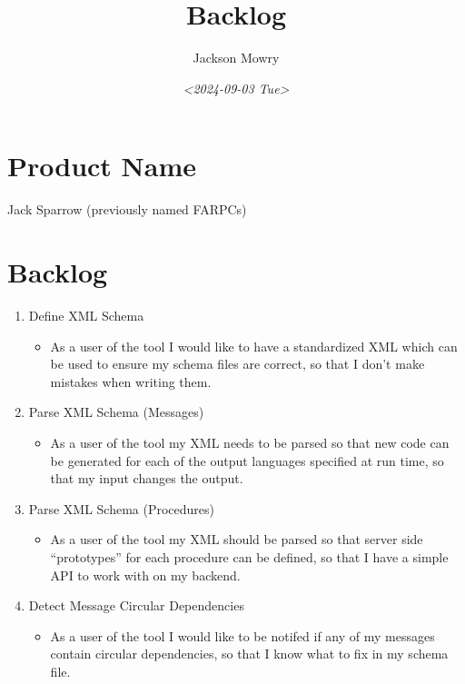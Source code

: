 \documentclass[11pt]{article}
\author{Jackson Mowry}
\date{\textit{<2024-09-03 Tue>}}
\title{Backlog}
\begin{document}
\maketitle
\section{Product Name}
\label{sec:org8e9baa5}
Jack Sparrow (previously named FARPCs)\\
\section{Backlog}
\label{sec:org45e162e}

\begin{enumerate}
\item Define XML Schema\\
\begin{itemize}
\item As a user of the tool I would like to have a standardized XML which can be used to ensure my schema files are correct, so that I don't make mistakes when writing them.\\
\end{itemize}
\item Parse XML Schema (Messages)\\
\begin{itemize}
\item As a user of the tool my XML needs to be parsed so that new code can be generated for each of the output languages specified at run time, so that my input changes the output.\\
\end{itemize}
\item Parse XML Schema (Procedures)\\
\begin{itemize}
\item As a user of the tool my XML should be parsed so that server side ``prototypes'' for each procedure can be defined, so that I have a simple API to work with on my backend.\\
\end{itemize}
\item Detect Message Circular Dependencies\\
\begin{itemize}
\item As a user of the tool I would like to be notifed if any of my messages contain circular dependencies, so that I know what to fix in my schema file.\\

\end{itemize}
\end{enumerate}
\end{document}
